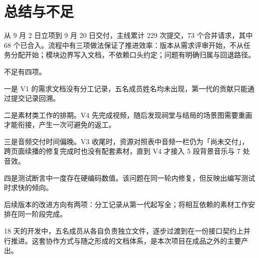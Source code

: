 \section{总结与不足}

从 9 月 2 日立项到 9 月 20 日交付，主线累计 229 次提交，73 个合并请求，其中 68 个已合入。流程中有三项做法保证了推进效率：版本从需求评审开始，不从任务分配开始；模块边界写入文档，不依赖口头约定；问题有明确归属与回退路径。

不足有四项。

一是 V1 的需求文档没有分工记录，五名成员姓名均未出现，第一代的贡献只能通过提交记录回溯。

二是素材类工作的排期。V4 先完成视频，随后发现祠堂与结局的场景图需要重画才能衔接，产生一次可避免的返工。

三是音频交付时间偏晚。V3 收尾时，资源对照表中音频一栏仍为「尚未交付」，跨页面续播的修复完成时也没有配套素材，直到 V4 才接入 5 段背景音乐与 7 处音效。

四是测试断言中一度存在硬编码数值。该问题在同一轮内修复，但反映出编写测试时求快的倾向。

后续版本的改进方向有两项：分工记录从第一代起写全；将相互依赖的素材工作安排在同一阶段完成。

18 天的开发中，五名成员从各自负责独立文件，逐步过渡到在一份接口契约上并行推进。这套协作方式与随之形成的文档体系，是本次项目在成品之外的主要产出。
